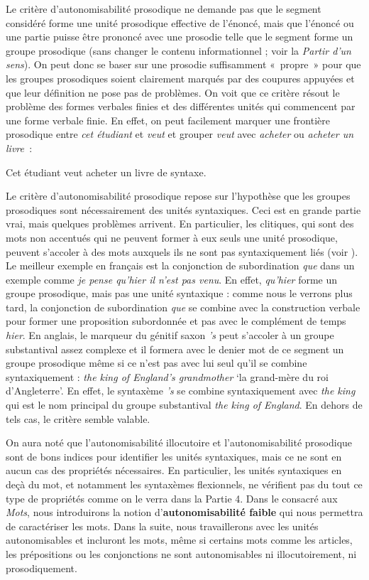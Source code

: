 Le critère d’autonomisabilité prosodique ne demande pas que le segment considéré forme une unité prosodique effective de l’énoncé, mais que l’énoncé ou une partie puisse être prononcé avec une prosodie telle que le segment forme un groupe prosodique (sans changer le contenu informationnel ; voir la  \textit{Partir d’un sens}). On peut donc se baser sur une prosodie suffisamment «~propre~» pour que les groupes prosodiques soient clairement marqués par des coupures appuyées et que leur définition ne pose pas de problèmes. On voit que ce critère résout le problème des formes verbales finies et des différentes unités qui commencent par une forme verbale finie. En effet, on peut facilement marquer une frontière prosodique entre \textit{cet étudiant} et \textit{veut} et grouper \textit{veut} avec \textit{acheter} ou \textit{acheter un livre~}:

\ea
    {Cet étudiant} {\textbar} {veut acheter} {\textbar} {un livre de syntaxe}.
\z

Le critère d’autonomisabilité prosodique repose sur l’hypothèse que les groupes prosodiques sont nécessairement des unités syntaxiques. Ceci est en grande partie vrai, mais quelques problèmes arrivent. En particulier, les clitiques, qui sont des mots non accentués qui ne peuvent former à eux seuls une unité prosodique, peuvent s’accoler à des mots auxquels ils ne sont pas syntaxiquement liés (voir ). Le meilleur exemple en français est la conjonction de subordination \textit{que} dans un exemple comme \textit{je pense {\textbar} qu’hier {\textbar} il n’est pas venu}. En effet, \textit{qu’hier} forme un groupe prosodique, mais pas une unité syntaxique : comme nous le verrons plus tard, la conjonction de subordination \textit{que} se combine avec la construction verbale pour former une proposition subordonnée et pas avec le complément de temps \textit{hier}. En anglais, le marqueur du génitif saxon \textit{’s} peut s’accoler à un groupe substantival assez complexe et il formera avec le denier mot de ce segment un groupe prosodique même si ce n’est pas avec lui seul qu’il se combine syntaxiquement : \textit{the king {\textbar} of England’s {\textbar} grandmother} ‘la grand-mère du roi d’Angleterre’. En effet, le syntaxème \textit{’s} se combine syntaxiquement avec \textit{the king} qui est le nom principal du groupe substantival \textit{the king of England}. En dehors de tels cas, le critère semble valable.

On aura noté que l’autonomisabilité illocutoire et l’autonomisabilité prosodique sont de bons indices pour identifier les unités syntaxiques, mais ce ne sont en aucun cas des propriétés nécessaires. En particulier, les unités syntaxiques en deçà du mot, et notamment les syntaxèmes flexionnels, ne vérifient pas du tout ce type de propriétés comme on le verra dans la Partie 4. Dans le  consacré aux \textit{Mots}, nous introduirons la notion d’\textbf{autonomisabilité faible} qui nous permettra de caractériser les mots. Dans la suite, nous travaillerons avec les unités autonomisables et incluront les mots, même si certains mots comme les articles, les prépositions ou les conjonctions ne sont autonomisables ni illocutoirement, ni prosodiquement.


